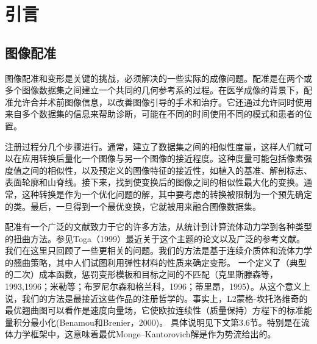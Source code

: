 \section{引言}\label{section : 1}

\subsection{图像配准}

图像配准和变形是关键的挑战，必须解决的一些实际的成像问题。配准是在两个或多个图像数据集之间建立一个共同的几何参考系的过程。在医学成像的背景下，配准允许合并术前图像信息，以改善图像引导的手术和治疗。它还通过允许同时使用来自多个数据集的信息来帮助诊断，可能在不同的时间使用不同的模式和患者的位置。

注册过程分几个步骤进行。通常，建立了数据集之间的相似性度量，这样人们就可以在应用转换后量化一个图像与另一个图像的接近程度。这种度量可能包括像素强度值之间的相似性，以及预定义的图像特征的接近性，如植入的基准、解剖标志、表面轮廓和山脊线。接下来，找到使变换后的图像之间的相似性最大化的变换。通常，这种转换是作为一个优化问题的解，其中要考虑的转换被限制为一个预先确定的类。最后，一旦得到一个最优变换，它就被用来融合图像数据集。

配准有一个广泛的文献致力于它的许多方法，从统计到计算流体动力学到各种类型的扭曲方法。参见Toga（1999）最近关于这个主题的论文以及广泛的参考文献。我们在这里只回顾了一些更相关的问题。我们的方法是基于连续介质体和流体力学的翘曲策略，其中人们试图利用弹性材料的性质来确定变形。
一个定义了（典型的二次）成本函数，惩罚变形模板和目标之间的不匹配（克里斯滕森等，1993,1996；米勒等；布罗尼尔森和格兰科，1996；蒂里昂，1995）。从这个意义上说，我们的方法是最接近这些作品的注册哲学的。事实上，L2蒙格-坎托洛维奇的最优翘曲图可以看作是速度向量场，它使欧拉连续性（质量保持）方程下的标准能量积分最小化(Benamou和Brenier，2000)。
具体说明见下文第3.6节。特别是在流体力学框架中，这意味着最优Monge–Kantorovich解是作为势流给出的。
